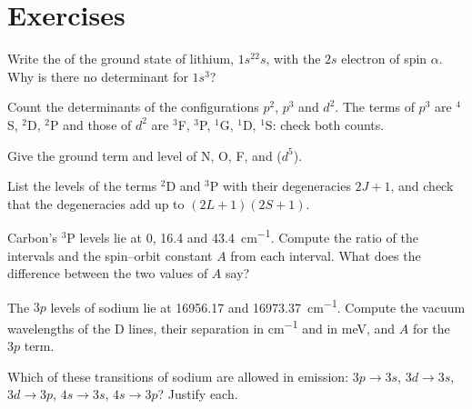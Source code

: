 \section{Exercises}

\begin{exercise}[$\star$]\label{exo:b3:many-electron-atoms:1}
Write the  of the ground state of lithium, $1s^22s$, with
the $2s$ electron of spin $\alpha$. Why is there no determinant for
$1s^3$?
\end{exercise}

\begin{exercise}[$\star$]\label{exo:b3:many-electron-atoms:2}
Count the determinants of the configurations $p^2$, $p^3$ and $d^2$. The terms
of $p^3$ are ${}^4$S, ${}^2$D, ${}^2$P and those of $d^2$ are ${}^3$F, ${}^3$P, ${}^1$G,
${}^1$D, ${}^1$S: check both counts.
\end{exercise}

\begin{exercise}[$\star$]\label{exo:b3:many-electron-atoms:3}
Give the ground term and level of N, O, F,  and  ($d^5$).
\end{exercise}

\begin{exercise}[$\star$]\label{exo:b3:many-electron-atoms:4}
List the levels of the terms ${}^2$D and ${}^3$P with their degeneracies $2J+1$,
and check that the degeneracies add up to $(2L+1)(2S+1)$.
\end{exercise}

\begin{exercise}[$\star\star$]\label{exo:b3:many-electron-atoms:5}
Carbon's ${}^3$P levels lie at 0, 16.4 and \qty{43.4}{cm^{-1}}. Compute the
ratio of the intervals and the spin--orbit constant $A$ from each interval.
What does the difference between the two values of $A$ say?
\end{exercise}

\begin{exercise}[$\star\star$]\label{exo:b3:many-electron-atoms:6}
The $3p$ levels of sodium lie at 16956.17 and \qty{16973.37}{cm^{-1}}. Compute
the vacuum wavelengths of the D lines, their separation in \unit{cm^{-1}} and
in meV, and $A$ for the $3p$ term.
\end{exercise}

\begin{exercise}[$\star\star$]\label{exo:b3:many-electron-atoms:7}
Which of these transitions of sodium are allowed in emission: $3p \to 3s$,
$3d \to 3s$, $3d \to 3p$, $4s \to 3s$, $4s \to 3p$? Justify each.
\end{exercise}

